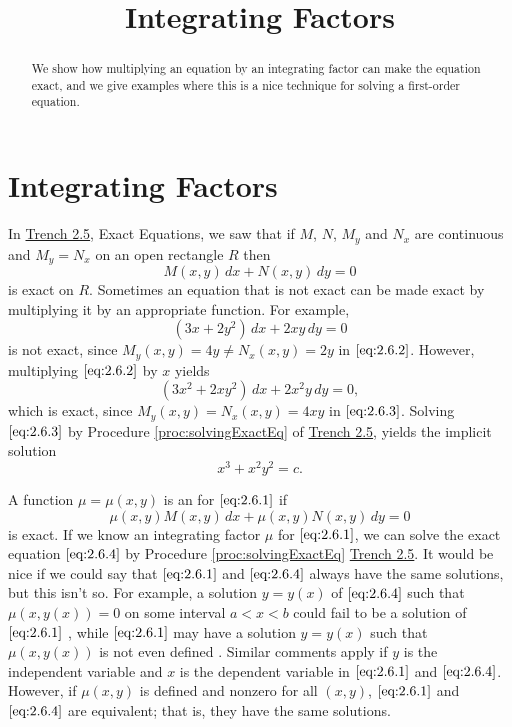 \documentclass{ximera}
\title{Integrating Factors}
\begin{document}
\begin{abstract}
We show how multiplying an equation by an integrating factor can make the equation exact, and we give examples where this is a nice technique for solving a first-order equation.
\end{abstract}

\maketitle



\section*{Integrating Factors}
In \href{https://ximera.osu.edu/ode/main/exactEquations/exactEquations}{Trench 2.5}, Exact Equations, we saw that if $M$, $N$, $M_y$ and $N_x$ are
continuous and $M_y=N_x$ on an open rectangle $R$ then
\begin{equation} \label{eq:2.6.1}
M(x,y)\,dx+N(x,y)\,dy=0
\end{equation}
is exact on $R$. Sometimes an equation that is not exact can be made exact by multiplying it by an appropriate function. For example,
\begin{equation}\label{eq:2.6.2}
(3x+2y^2)\,dx+2xy\,dy=0
\end{equation}
is  not exact, since
$M_y(x,y)=4y\neq  N_x(x,y)=2y$ in $\eqref{eq:2.6.2}$.
 However, multiplying $\eqref{eq:2.6.2}$  by $x$ yields
\begin{equation}\label{eq:2.6.3}
(3x^2+2xy^2)\,dx+2x^2y\,dy=0,
\end{equation}
which is exact, since
$M_y(x,y)=N_x(x,y)=4xy$ in $\eqref{eq:2.6.3}$.
Solving $\eqref{eq:2.6.3}$ by Procedure \ref{proc:solvingExactEq} of \href{https://ximera.osu.edu/ode/main/exactEquations/exactEquations}{Trench 2.5},
 yields the implicit solution
$$
x^3+x^2y^2=c.
$$

A function $\mu=\mu(x,y)$ is  an  for
$\eqref{eq:2.6.1}$  if
\begin{equation}\label{eq:2.6.4}
 \mu(x,y)M (x,y)\,dx+\mu(x,y)N (x,y)\,dy=0
 \end{equation}
 is exact. If we know an integrating
factor $\mu$ for $\eqref{eq:2.6.1}$, we can solve the exact equation
$\eqref{eq:2.6.4}$ by Procedure \ref{proc:solvingExactEq} \href{https://ximera.osu.edu/ode/main/exactEquations/exactEquations}{Trench 2.5}. It would be
nice if we could say that $\eqref{eq:2.6.1}$ and $\eqref{eq:2.6.4}$ always have the
same solutions, but this isn't so. For example, a solution
$y=y(x)$ of $\eqref{eq:2.6.4}$ such that $\mu(x,y(x))=0$ on some interval
$a<x<b$ could fail to be a solution of $\eqref{eq:2.6.1}$
, while
$\eqref{eq:2.6.1}$ may have a solution $y=y(x)$ such that $\mu(x,y(x))$
is not even defined 
. Similar comments
apply if $y$ is the independent variable and $x$ is the dependent
variable in $\eqref{eq:2.6.1}$ and $\eqref{eq:2.6.4}$.  However, if $\mu(x,y)$
is defined and nonzero for all $(x,y)$, $\eqref{eq:2.6.1}$ and
$\eqref{eq:2.6.4}$ are equivalent; that is, they have the same solutions.
\end{document}
